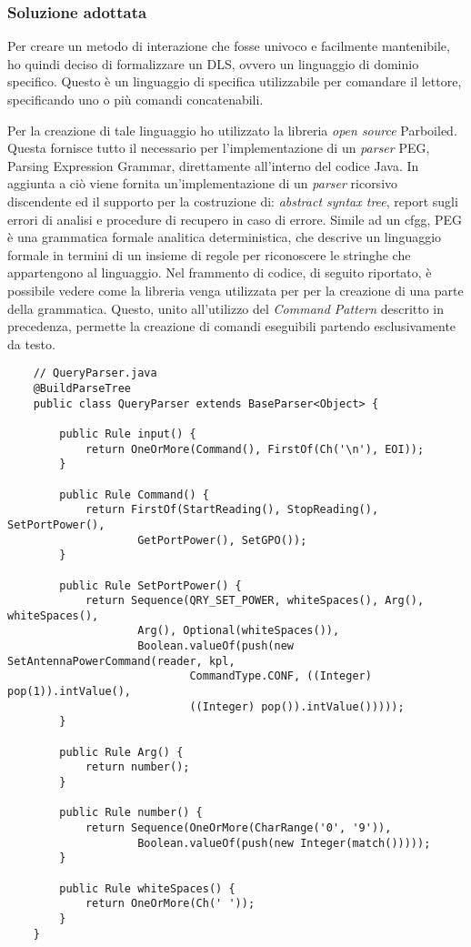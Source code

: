 \subsubsection*{Soluzione adottata}
Per creare un metodo di interazione che fosse univoco e facilmente mantenibile, ho quindi deciso di formalizzare un DLS, ovvero
un linguaggio di dominio specifico. Questo è un linguaggio di specifica utilizzabile per comandare il lettore, specificando uno o più
comandi concatenabili.

Per la creazione di tale linguaggio ho utilizzato la libreria \emph{open source} Parboiled. Questa fornisce tutto il necessario per l'implementazione
di un \emph{parser} PEG, Parsing Expression Grammar, direttamente all'interno del codice Java. In aggiunta a ciò viene fornita un'implementazione di un \emph{parser} ricorsivo discendente ed il
supporto per la costruzione di: \emph{abstract syntax tree}, report sugli errori di analisi e procedure di recupero in caso di errore.
Simile ad un \gls{cfgg}, PEG è una grammatica formale analitica deterministica, che descrive un linguaggio formale in termini di un insieme di regole per riconoscere
le stringhe che appartengono al linguaggio.
Nel frammento di codice, di seguito riportato, è possibile vedere come la libreria venga utilizzata per per la creazione di una parte della grammatica.
Questo, unito all'utilizzo del \emph{Command Pattern} descritto in precedenza, permette la creazione di comandi eseguibili partendo esclusivamente da testo.
\begin{lstlisting}
    // QueryParser.java
    @BuildParseTree
    public class QueryParser extends BaseParser<Object> {
        
        public Rule input() {
		    return OneOrMore(Command(), FirstOf(Ch('\n'), EOI));
	    }

	    public Rule Command() {
		    return FirstOf(StartReading(), StopReading(), SetPortPower(),
		            GetPortPower(), SetGPO());
	    }

        public Rule SetPortPower() {
		    return Sequence(QRY_SET_POWER, whiteSpaces(), Arg(), whiteSpaces(),
		            Arg(), Optional(whiteSpaces()),
		            Boolean.valueOf(push(new SetAntennaPowerCommand(reader, kpl,
		                    CommandType.CONF, ((Integer) pop(1)).intValue(),
		                    ((Integer) pop()).intValue()))));
	    }

        public Rule Arg() {
		    return number();
	    }

	    public Rule number() {
		    return Sequence(OneOrMore(CharRange('0', '9')),
		            Boolean.valueOf(push(new Integer(match()))));
	    }

	    public Rule whiteSpaces() {
		    return OneOrMore(Ch(' '));
	    }
    }
\end{lstlisting}

